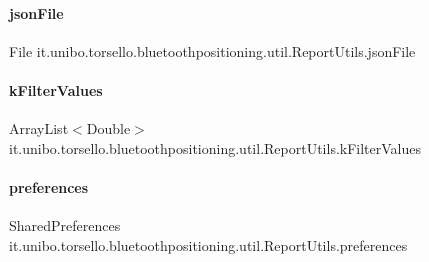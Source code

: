 \paragraph{\texorpdfstring{json\+File}{jsonFile}}
{\footnotesize\ttfamily File it.\+unibo.\+torsello.\+bluetoothpositioning.\+util.\+Report\+Utils.\+json\+File\hspace{0.3cm}{\ttfamily [private]}}

\hypertarget{classit_1_1unibo_1_1torsello_1_1bluetoothpositioning_1_1util_1_1ReportUtils_a9a40344497c5522bbc90f03581c2713a_a9a40344497c5522bbc90f03581c2713a}{}\label{classit_1_1unibo_1_1torsello_1_1bluetoothpositioning_1_1util_1_1ReportUtils_a9a40344497c5522bbc90f03581c2713a_a9a40344497c5522bbc90f03581c2713a} 
\paragraph{\texorpdfstring{k\+Filter\+Values}{kFilterValues}}
{\footnotesize\ttfamily Array\+List$<$Double$>$ it.\+unibo.\+torsello.\+bluetoothpositioning.\+util.\+Report\+Utils.\+k\+Filter\+Values\hspace{0.3cm}{\ttfamily [private]}}

\hypertarget{classit_1_1unibo_1_1torsello_1_1bluetoothpositioning_1_1util_1_1ReportUtils_af1f57227f8c42073b4f8f2b65e86ebd7_af1f57227f8c42073b4f8f2b65e86ebd7}{}\label{classit_1_1unibo_1_1torsello_1_1bluetoothpositioning_1_1util_1_1ReportUtils_af1f57227f8c42073b4f8f2b65e86ebd7_af1f57227f8c42073b4f8f2b65e86ebd7} 
\paragraph{\texorpdfstring{preferences}{preferences}}
{\footnotesize\ttfamily Shared\+Preferences it.\+unibo.\+torsello.\+bluetoothpositioning.\+util.\+Report\+Utils.\+preferences\hspace{0.3cm}{\ttfamily [private]}}

